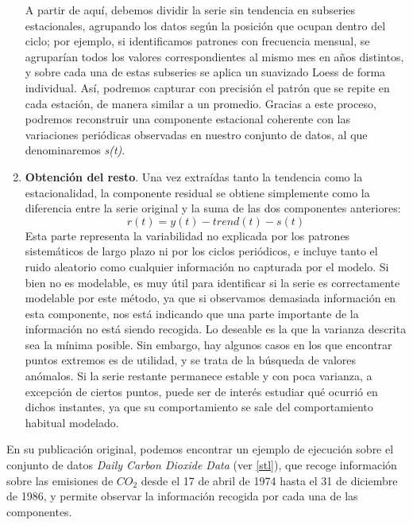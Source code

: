 \begin{enumerate}
    A partir de aquí, debemos dividir la serie sin tendencia en subseries estacionales, agrupando los datos según la posición que ocupan dentro del ciclo; por ejemplo, si identificamos patrones con frecuencia mensual, se agruparían todos los valores correspondientes al mismo mes en años distintos, y sobre cada una de estas subseries se aplica un suavizado Loess de forma individual. Así, podremos capturar con precisión el patrón que se repite en cada estación, de manera similar a un promedio. Gracias a este proceso, podremos reconstruir una componente estacional coherente con las variaciones periódicas observadas en nuestro conjunto de datos, al que denominaremos \textit{s(t)}.

    \item \textbf{Obtención del resto}. Una vez extraídas tanto la tendencia como la estacionalidad, la componente residual se obtiene simplemente como la diferencia entre la serie original y la suma de las dos componentes anteriores:
    $$r(t) = y(t) - trend(t) - s(t)$$
    Esta parte representa la variabilidad no explicada por los patrones sistemáticos de largo plazo ni por los ciclos periódicos, e incluye tanto el ruido aleatorio como cualquier información no capturada por el modelo. Si bien no es modelable, es muy útil para identificar si la serie es correctamente modelable por este método, ya que si observamos demasiada información en esta componente, nos está indicando que una parte importante de la información no está siendo recogida. Lo deseable es la que la varianza descrita sea la mínima posible. Sin embargo, hay algunos casos en los que encontrar puntos extremos es de utilidad, y se trata de la búsqueda de valores anómalos. Si la serie restante permanece estable y con poca varianza, a excepción de ciertos puntos, puede ser de interés estudiar qué ocurrió en dichos instantes, ya que su comportamiento se sale del comportamiento habitual modelado.
\end{enumerate}

En su publicación original, podemos encontrar un ejemplo de ejecución sobre el conjunto de datos \textit{Daily Carbon Dioxide Data} (ver \ref{stl}), que recoge información sobre las emisiones de $CO_2$ desde el 17 de abril de 1974 hasta el 31 de diciembre de 1986, y permite observar la información recogida por cada una de las componentes.

